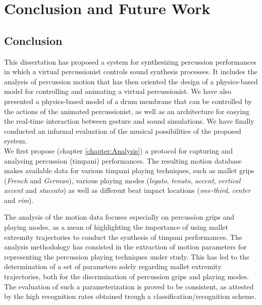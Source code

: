 \chapter{Conclusion and Future Work}
\label{chapter:Conclusion}



	\section{Conclusion}
	\label{sec:Conclusion_Conlusion}

This dissertation has proposed a system for synthesizing percussion performances in which a virtual percussionist controls sound synthesis processes. It includes the analysis of percussion motion that has then oriented the design of a physics-based model for controlling and animating a virtual percussionist. We have also presented a physics-based model of a drum membrane that can be controlled by the actions of the animated percussionist, as well as an architecture for easying the real-time interaction between gesture and sound simulations. We have finally conducted an informal evaluation of the musical possibilities of the proposed system.\\

We first propose (chapter \ref{chapter:Analysis}) a protocol for capturing and analysing percussion (timpani) performances. The resulting motion database makes available data for various timpani playing techniques, such as mallet grips (\emph{French} and \emph{German}), various playing modes (\emph{legato}, \emph{tenuto}, \emph{accent}, \emph{vertical accent} and \emph{staccato}) as well as different beat impact locations (\emph{one-third}, \emph{center} and \emph{rim}).

The analysis of the motion data focuses especially on percussion grips and playing modes, as a mean of highlighting the importance of using mallet extremity trajectories to conduct the synthesis of timpani performances. The analysis methodology has consisted in the extraction of motion parameters for representing the percussion playing techniques under study. This has led to the determination of a set of parameters solely regarding mallet extremity trajectories, both for the discrimination of percussion grips and playing modes. The evaluation of such a parameterization is proved to be consistent, as attested by the high recognition rates obtained trough a classification/recognition scheme.\\

